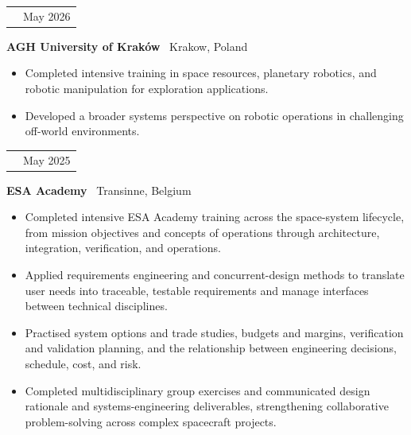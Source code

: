 \documentclass[10pt,a4paper]{article}
\makeatletter
\newcommand{\RoleSize}{10.3pt}
\newcommand{\CompanySize}{9.6pt}
\newcommand{\DurationSize}{9pt}
\newcommand{\BodySize}{9.2pt}
\newcommand{\RoleLineSize}{11.5pt}
\newcommand{\CompanyLineSize}{10.8pt}
\newcommand{\DurationLineSize}{9pt}
\newcommand{\BodyLineSize}{11pt}
\newcommand{\EntryBefore}{0pt}
\newcommand{\RoleToCompany}{-5pt}
\newcommand{\CompanyToBullets}{3pt}
\newcommand{\EntryAfter}{6pt}
\newcommand{\BulletSpacing}{2pt}
\newcommand{\BulletBefore}{0pt}
\newcommand{\BulletIndent}{1.25em}
\newcommand{\DurationWidth}{4.5cm}
\newcommand{\CVEntry}[5]{

    \vspace{\EntryBefore}


    \noindent
    \begin{tabularx}{\textwidth}{
        @{}
        >{\raggedright\arraybackslash}X
        >{\raggedleft\arraybackslash}p{\DurationWidth}
        @{}
    }

        {\fontsize{\RoleSize}{\RoleLineSize}
        \selectfont
        \textbf{\textcolor{CVBlack}{#1}}}
        &
        {\fontsize{\DurationSize}{\DurationLineSize}
        \selectfont
        \textcolor{CVGray}{#4}}

    \end{tabularx}

    \vspace{\RoleToCompany}


    \noindent
    {\fontsize{\CompanySize}{\CompanyLineSize}
    \selectfont
    \textbf{\textcolor{CVDarkGray}{#2}}
    \textcolor{CVGray}{\textbar\ #3}}

    \vspace{\CompanyToBullets}


    \begin{itemize}[
        leftmargin=\BulletIndent,
        itemsep=\BulletSpacing,
        topsep=\BulletBefore,
        parsep=0pt,
        partopsep=0pt
    ]
        #5
    \end{itemize}

    \vspace{\EntryAfter}
}
\newcommand{\CVBullet}[1]{
    \item
    {\fontsize{\BodySize}{\BodyLineSize}
    \selectfont
    \textcolor{CVDarkGray}{#1}}
}
\makeatother
\begin{document}
\CVEntry
{Space Resources \& Robotics Summer School}
{AGH University of Kraków}
{Krakow, Poland}
{May 2026}
{
    \CVBullet{Completed intensive training in space resources, planetary robotics, and robotic manipulation for exploration applications.}

    \CVBullet{Developed a broader systems perspective on robotic operations in challenging off-world environments.}
}

\CVEntry
{Space Systems Engineering Training Course}
{ESA Academy}
{Transinne, Belgium}
{May 2025}
{
    \CVBullet{Completed intensive ESA Academy training across the space-system lifecycle, from mission objectives and concepts of operations through architecture, integration, verification, and operations.}

    \CVBullet{Applied requirements engineering and concurrent-design methods to translate user needs into traceable, testable requirements and manage interfaces between technical disciplines.}

    \CVBullet{Practised system options and trade studies, budgets and margins, verification and validation planning, and the relationship between engineering decisions, schedule, cost, and risk.}

    \CVBullet{Completed multidisciplinary group exercises and communicated design rationale and systems-engineering deliverables, strengthening collaborative problem-solving across complex spacecraft projects.}
}
\end{document}
